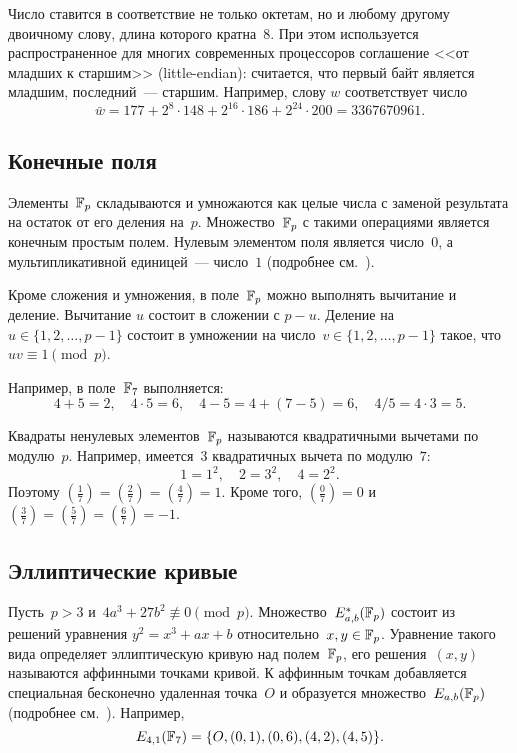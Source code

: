 Число ставится в соответствие не только октетам, но и любому другому
двоичному слову, длина которого кратна~$8$. 
%
При этом используется распространенное для многих современных 
процессоров соглашение <<от младших к старшим>> (little-endian):
считается, что первый байт является младшим, последний~--- старшим.
Например, слову $w$ соответствует число
$$
\bar{w}=177+2^{8}\cdot 148+2^{16}\cdot 186+2^{24}\cdot 200 = 3367670961.
$$

\subsection{Конечные поля}

Элементы~$\mathbb{F}_p$ складываются и умножаются 
как целые числа с заменой результата на остаток от его деления на~$p$.
Множество~$\mathbb{F}_p$ с такими операциями является конечным простым полем.
Нулевым элементом поля является число~$0$,
а мультипликативной единицей~--- число~$1$
(подробнее см.~\cite{LidNid88}).

Кроме сложения и умножения, в поле~$\mathbb{F}_p$ можно выполнять вычитание и деление. 
%
Вычитание $u$ состоит в сложении с $p-u$.
%
Деление на $u\in\{1,2,\ldots,p-1\}$ состоит в 
умножении на число~$v\in\{1,2,\ldots,p-1\}$ такое, 
что $uv\equiv 1\pmod{p}$.

Например, в поле~$\mathbb{F}_7$ выполняется:
$$
4+5=2,\quad
4\cdot 5=6,\quad
4-5=4+(7-5)=6,\quad
4/5 = 4\cdot 3=5.
$$

Квадраты ненулевых элементов~$\mathbb{F}_p$ 
называются квадратичными вычетами по модулю~$p$. 
Например, имеется~$3$ квадратичных вычета по модулю~$7$:
$$
1=1^2,\quad
2=3^2,\quad
4=2^2.
$$
Поэтому 
$\left(\frac{1}{7}\right)=\left(\frac{2}{7}\right)=\left(\frac{4}{7}\right)=1$.
Кроме того, $\left(\frac{0}{7}\right)=0$ и 
$\left(\frac{3}{7}\right)=\left(\frac{5}{7}\right)=\left(\frac{6}{7}\right)=-1$.

\subsection{Эллиптические кривые}

Пусть~$p>3$ и~$4a^3+27b^2\not\equiv 0\pmod{p}$.
Множество~$E^*_{a,b}(\mathbb{F}_p)$ состоит из решений уравнения 
$y^2=x^3+ax+b$ относительно~$x,y\in\mathbb{F}_p$. 
Уравнение такого вида определяет эллиптическую кривую над полем~$\mathbb{F}_p$,
его решения~$(x,y)$ называются аффинными точками кривой.
К аффинным точкам добавляется специальная бесконечно удаленная
точка~$O$ и образуется множество~$E_{a,b}(\mathbb{F}_p)$
(подробнее см.~\cite{ECC}).
%
Например,
$$
E_{4,1}(\mathbb{F}_{7})=\{O,(0,1),(0,6),(4,2),(4,5)\}.
$$

